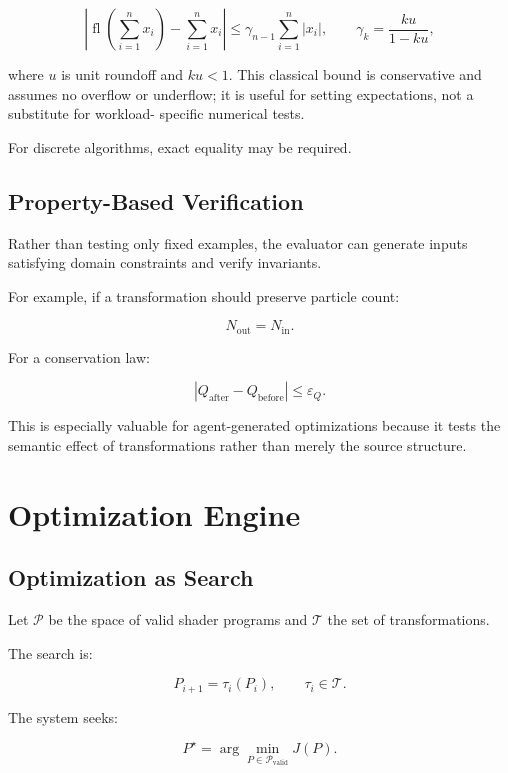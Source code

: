 \documentclass[11pt,a4paper,oneside]{report}
\begin{document}
\begin{equation}
\left|\operatorname{fl}\!\left(\sum_{i=1}^{n}x_i\right)-\sum_{i=1}^{n}x_i\right|
\le \gamma_{n-1}\sum_{i=1}^{n}|x_i|,
\qquad
\gamma_k=\frac{ku}{1-ku},
\end{equation}

where $u$ is unit roundoff and $ku<1$. This classical bound is conservative and assumes no
overflow or underflow; it is useful for setting expectations, not a substitute for workload-
specific numerical tests.

For discrete algorithms, exact equality may be required.

\section{Property-Based Verification}

Rather than testing only fixed examples, the evaluator can generate inputs satisfying domain
constraints and verify invariants.

For example, if a transformation should preserve particle count:

\[
N_{\mathrm{out}}=N_{\mathrm{in}}.
\]

For a conservation law:

\[
\left|
Q_{\mathrm{after}}-Q_{\mathrm{before}}
\right|
\le \varepsilon_Q.
\]

This is especially valuable for agent-generated optimizations because it tests the semantic
effect of transformations rather than merely the source structure.

\chapter{Optimization Engine}

\section{Optimization as Search}

Let $\mathcal{P}$ be the space of valid shader programs and $\mathcal{T}$ the set of
transformations.

The search is:

\begin{equation}
P_{i+1}=\tau_i(P_i),
\qquad
\tau_i\in\mathcal{T}.
\end{equation}

The system seeks:

\begin{equation}
P^\star
=
\arg\min_{P\in\mathcal{P}_{\mathrm{valid}}}
J(P).
\end{equation}
\end{document}
